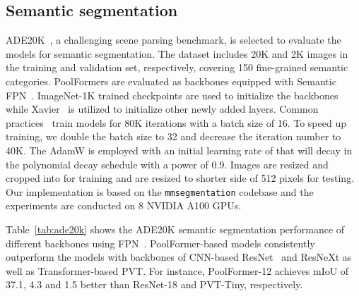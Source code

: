 \begin{table*}[t]
\begin{tabular}{l|l|c c c}
\bottomrule
\end{tabular} \vspace{-3mm}
\caption{\textbf{Ablation for PoolFormer on ImageNet-1K classification benchmark.} PoolFormer-S12 is utilized as the baseline to conduct ablation study. The top-1 accuracy on the validation set is reported. This token mixer utilizes global random matrix  (parameters are frozen after random initialization) to conduct token mixing by  where  are input tokens with the token length of  and channel dimension of . Modified Layer Normalization (MLN) computes the mean and variance along token and channel dimensions compared with vanilla Layer Normalization only along channel dimension. MLN can be implemented with GroupNorm API in PyTorch by specifying the group number equal to 1. The numbers of MACs are counted by \texttt{fvcore} \cite{fvcore} library.
}
\label{tab:ablation}
\normalsize
\vspace{-2mm}
\end{table*}


\vspace{-1pt}
\subsection{Semantic segmentation}
\vspace{-3pt}
ADE20K~\cite{ade20k}, a challenging scene parsing benchmark, is selected to evaluate the models for semantic segmentation. The dataset includes 20K and 2K images in the training and validation set, respectively, covering 150 fine-grained semantic categories. PoolFormers are evaluated as backbones equipped with Semantic FPN~\cite{fpn}. ImageNet-1K trained checkpoints are used to initialize the backbones while Xavier~\cite{glorot2010understanding} is utilized to initialize other newly added layers. Common practices~\cite{fpn,chen2017deeplab} train models for 80K iterations with a batch size of 16. To speed up training, we double the batch size to 32 and decrease the iteration number to 40K. The AdamW \cite{adam, adamw} is employed with an initial learning rate of  that will decay in the polynomial decay schedule with a power of 0.9. Images are resized and cropped into  for training and are resized to shorter side of 512 pixels for testing. Our implementation is based on the \texttt{mmsegmentation} \cite{mmseg2020} codebase and the experiments are conducted on 8 NVIDIA A100 GPUs. 


 Table~\ref{tab:ade20k} shows the ADE20K semantic segmentation performance of different backbones using FPN~\cite{fpn}. PoolFormer-based models consistently outperform the models with backbones of CNN-based ResNet~\cite{resnet} and ResNeXt \cite{xie2017aggregated} as well as Transformer-based PVT. For instance, PoolFormer-12 achieves mIoU of 37.1, 4.3 and 1.5 better than ResNet-18 and PVT-Tiny, respectively. 


